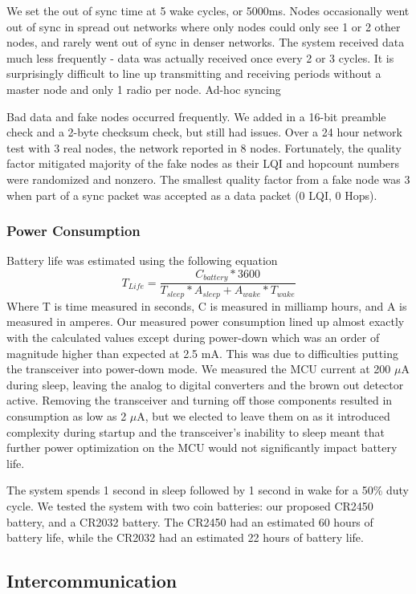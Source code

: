 We set the out of sync time at 5 wake cycles, or 5000ms. Nodes occasionally went out of sync in spread out networks where only nodes could only see 1 or 2 other nodes, and rarely went out of sync in denser networks. The system received data much less frequently - data was actually received once every 2 or 3 cycles. It is surprisingly difficult to line up transmitting and receiving periods without a master node and only 1 radio per node. Ad-hoc syncing 

Bad data and fake nodes occurred  frequently. We added in a 16-bit preamble check and a 2-byte checksum check, but still had issues. Over a 24 hour network test with 3 real nodes, the network reported in 8 nodes. Fortunately, the quality factor mitigated majority of the fake nodes as their LQI and hopcount numbers were randomized and nonzero. The smallest quality factor from a fake node was 3 when part of a sync packet was accepted as a data packet (0 LQI, 0 Hops).

\subsubsection{Power Consumption}
Battery life was estimated using the following equation
\[T_{Life}=\frac{C_{battery} * 3600}{T_{sleep}*A_{sleep} + A_{wake}*T_{wake}}\] Where T is time measured in seconds, C is measured in milliamp hours, and A is measured in amperes.
Our measured power consumption lined up almost exactly with the calculated values except during power-down which was an order of magnitude higher than expected at 2.5 mA. This was due to difficulties putting the transceiver into power-down mode. We measured the MCU current at 200 $\mu$A during sleep, leaving the analog to digital converters and the brown out detector active. Removing the transceiver and turning off those components resulted in consumption as low as 2 $\mu$A, but we elected to leave them on as it introduced complexity during startup and the transceiver's inability to sleep meant that further power optimization on the MCU would not significantly impact battery life.

The system spends 1 second in sleep followed by 1 second in wake for a 50\% duty cycle. We tested the system with two coin batteries: our proposed CR2450 battery, and a CR2032 battery. The CR2450 had an estimated 60 hours of battery life, while the CR2032 had an estimated 22 hours of battery life. 

\subsection{Intercommunication}

